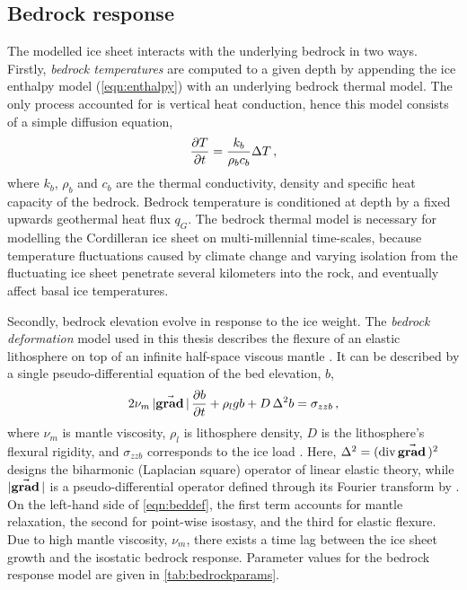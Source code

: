 \documentclass{article}
\newcommand{\vect}[1]{\va*{#1}} %
\renewcommand{\div}[1]{\mathrm{div}\,#1}            %
\renewcommand{\grad}[1]{\vect{\mathrm{grad}}\,#1}   %
\begin{document}
\subsection{Bedrock response}

The modelled ice sheet interacts with the underlying bedrock in two ways.
Firstly, \emph{bedrock temperatures} are computed to a given depth by
appending the
ice enthalpy model (\ref{eqn:enthalpy}) with an underlying bedrock thermal
model. The only process accounted for is vertical heat conduction, hence this model
consists of a simple diffusion equation,
\begin{equation}
    \pdv{T}{t} = \frac{k_b}{\rho_b c_b} \Delta T \,,
\end{equation}
where $k_b$, $\rho_b$ and $c_b$ are the thermal conductivity, density and
specific heat capacity of the bedrock. Bedrock temperature is conditioned at
depth by a fixed upwards geothermal heat flux $q_G$. The bedrock thermal model
is necessary for modelling the Cordilleran ice sheet on multi-millennial
time-scales, because temperature fluctuations caused by climate change and
varying isolation from the fluctuating ice sheet penetrate several kilometers
into the
rock, and eventually affect basal ice temperatures.

Secondly, bedrock elevation evolve in response to the ice weight. The
\emph{bedrock deformation} model used in this thesis describes the flexure of
an elastic
lithosphere on top of an infinite half-space viscous mantle
\citep{Lingle.Clark.1985}. It can be described by a single pseudo-differential
equation of the bed elevation, $b$,
\begin{equation}
    \label{eqn:beddef}
    2\nu_m\,|\grad|\,\pdv{b}{t} + \rho_l g b + D\,\Delta^2 b = \sigma_{zzb} \,,
\end{equation}
where $\nu_m$ is mantle viscosity, $\rho_l$ is lithosphere density, $D$ is the
lithosphere's flexural rigidity, and $\sigma_{zzb}$ corresponds to the ice load
\citep{Bueler.etal.2007}. Here, ${\Delta^2 = (\div\grad{})^2}$ designs the
biharmonic (Laplacian square) operator of
linear elastic theory, while $|\grad{}|$ is a pseudo-differential operator
defined through its Fourier transform by \citet[Eq.~6]{Bueler.etal.2007}. On
the left-hand side of \cref{eqn:beddef}, the first term accounts for mantle
relaxation, the second for point-wise isostasy, and the third for elastic
flexure. Due to high mantle viscosity, $\nu_m$, there exists a time lag between
the ice sheet growth and the isostatic bedrock response. Parameter values for
the bedrock response model are given in \cref{tab:bedrockparams}.
\end{document}
